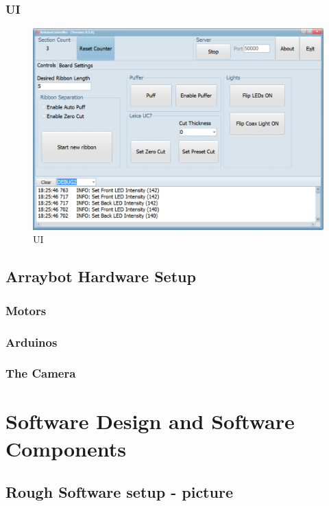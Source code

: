 \documentclass[11pt,fleqn]{book} %
\begin{document}
\clearpage
\subsection{\abc{} UI}
\begin{figure}
\centering\includegraphics[scale=0.85]{ARDC_UI_1}
\caption{\abc{} UI}
\end{figure}

\clearpage


\section{Arraybot Hardware Setup}

\subsection{Motors}
\subsection{Arduinos}
\subsection{The Camera}



\chapter{Software Design and Software Components}
\section{Rough Software setup - picture}
\end{document}

